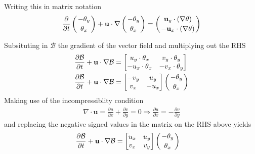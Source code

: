Writing this in matrix notation
\begin{align*}
  \frac{\partial }{\partial t} \left( -\theta_{y} \atop \theta_{x} \right) + \mathbf{u} \cdot \nabla \left( -\theta_{y} \atop \theta_{x} \right) = \left( \mathbf{u}_{y} \cdot (\nabla \theta) \atop -\mathbf{u}_{x} \cdot (\nabla \theta) \right)  
\end{align*}

Subsituting in $\mathcal{B}$ the gradient of the vector field  and multiplying out the RHS
\begin{align*}
  \frac{\partial \mathcal{B}}{\partial t}  + \mathbf{u} \cdot \nabla \mathcal{B} &= 
      \begin{bmatrix}
	 u_{y} \cdot \theta_{x}  & v_{y} \cdot \theta_{y} \\
	- u_{x} \cdot \theta_{x}  & -v_{x} \cdot \theta_{y} 
      \end{bmatrix} \\
  \frac{\partial \mathcal{B}}{\partial t}  + \mathbf{u} \cdot \nabla \mathcal{B} &= 
      \begin{bmatrix}
	-v_{y} & u_{y} \\
	v_{x} & -u_{x}  
      \end{bmatrix}\left( -\theta_{y} \atop \theta_{x} \right) 
\end{align*}
Making use of the incompressiblity condition
\begin{align*}
 \nabla \cdot \mathbf{u} = \frac{\partial u}{\partial x} + \frac{\partial v}{\partial y} = 0 \Rightarrow \frac{\partial u}{\partial x} = -\frac{\partial v}{\partial y}
\end{align*}
and replacing the negative signed values in the matrix on the RHS above yields 
\begin{align*}
  \frac{\partial \mathcal{B}}{\partial t}  + \mathbf{u} \cdot \nabla \mathcal{B} &= 
      \begin{bmatrix}
	u_{x} & u_{y} \\
	v_{x} & v_{y}  
      \end{bmatrix}\left( -\theta_{y} \atop \theta_{x} \right) 
\end{align*}

